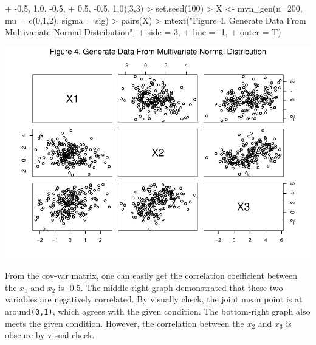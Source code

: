 \documentclass[
]{article}
\newenvironment{Shaded}{\begin{snugshade}}{\end{snugshade}}
\newcommand{\AttributeTok}[1]{\textcolor[rgb]{0.77,0.63,0.00}{#1}}
\newcommand{\DecValTok}[1]{\textcolor[rgb]{0.00,0.00,0.81}{#1}}
\newcommand{\FloatTok}[1]{\textcolor[rgb]{0.00,0.00,0.81}{#1}}
\newcommand{\FunctionTok}[1]{\textcolor[rgb]{0.00,0.00,0.00}{#1}}
\newcommand{\NormalTok}[1]{#1}
\newcommand{\OtherTok}[1]{\textcolor[rgb]{0.56,0.35,0.01}{#1}}
\newcommand{\SpecialCharTok}[1]{\textcolor[rgb]{0.00,0.00,0.00}{#1}}
\newcommand{\StringTok}[1]{\textcolor[rgb]{0.31,0.60,0.02}{#1}}
\begin{document}
\begin{Shaded}
\begin{Highlighting}[]
\SpecialCharTok{+}                 \SpecialCharTok{{-}}\FloatTok{0.5}\NormalTok{, }\FloatTok{1.0}\NormalTok{, }\SpecialCharTok{{-}}\FloatTok{0.5}\NormalTok{,}
\SpecialCharTok{+}                 \FloatTok{0.5}\NormalTok{, }\SpecialCharTok{{-}}\FloatTok{0.5}\NormalTok{, }\FloatTok{1.0}\NormalTok{),}\DecValTok{3}\NormalTok{,}\DecValTok{3}\NormalTok{)}
\SpecialCharTok{\textgreater{}} \FunctionTok{set.seed}\NormalTok{(}\DecValTok{100}\NormalTok{)}
\SpecialCharTok{\textgreater{}}\NormalTok{ X }\OtherTok{\textless{}{-}} \FunctionTok{mvn\_gen}\NormalTok{(}\AttributeTok{n=}\DecValTok{200}\NormalTok{, }\AttributeTok{mu =} \FunctionTok{c}\NormalTok{(}\DecValTok{0}\NormalTok{,}\DecValTok{1}\NormalTok{,}\DecValTok{2}\NormalTok{), }\AttributeTok{sigma =}\NormalTok{ sig)}
\SpecialCharTok{\textgreater{}} \FunctionTok{pairs}\NormalTok{(X)}
\SpecialCharTok{\textgreater{}} \FunctionTok{mtext}\NormalTok{(}\StringTok{"Figure 4. Generate Data From Multivariate Normal Distribution"}\NormalTok{,}
\SpecialCharTok{+}       \AttributeTok{side =} \DecValTok{3}\NormalTok{,}
\SpecialCharTok{+}       \AttributeTok{line =} \SpecialCharTok{{-}}\DecValTok{1}\NormalTok{,}
\SpecialCharTok{+}       \AttributeTok{outer =}\NormalTok{ T)}
\end{Highlighting}
\end{Shaded}

\includegraphics[width=1\linewidth,height=0.45\textheight]{HW_02_Chenguang_Pan_files/figure-latex/unnamed-chunk-5-1}

From the cov-var matrix, one can easily get the correlation coefficient
between the \(x_1\) and \(x_2\) is -0.5. The middle-right graph
demonstrated that these two variables are negatively correlated. By
visually check, the joint mean point is at around\texttt{(0,1)}, which
agrees with the given condition. The bottom-right graph also meets the
given condition. However, the correlation between the \(x_2\) and
\(x_3\) is obscure by visual check.
\end{document}
